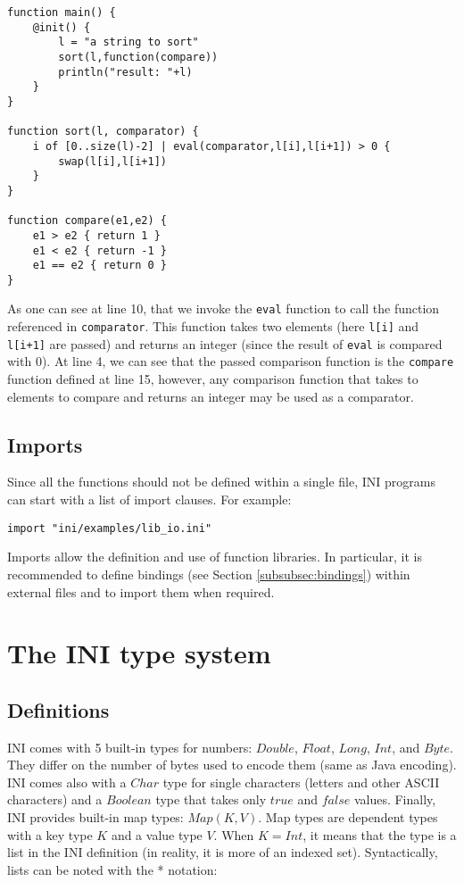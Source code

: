 \documentclass[11pt]{article}
\begin{document}
{ \small
\begin{lstlisting}
function main() {
	@init() {
		l = "a string to sort"
		sort(l,function(compare))
		println("result: "+l)
	}
}

function sort(l, comparator) {
	i of [0..size(l)-2] | eval(comparator,l[i],l[i+1]) > 0 {
		swap(l[i],l[i+1])
	}
}

function compare(e1,e2) {
	e1 > e2 { return 1 }
	e1 < e2 { return -1 }
	e1 == e2 { return 0 }
}
\end{lstlisting} }

As one can see at line 10, that we invoke the \texttt{eval} function to call the function referenced in \texttt{comparator}. This function takes two elements (here \texttt{l[i]} and \texttt{l[i+1]} are passed) and returns an integer (since the result of \texttt{eval} is compared with 0). At line 4, we can see that the passed comparison function is the \texttt{compare} function defined at line 15, however, any comparison function that takes to elements to compare and returns an integer may be used as a comparator.

\subsection{Imports}

Since all the functions should not be defined within a single file, INI programs can start with a list of import clauses. For example:

\begin{lstlisting}[numbers=none]
import "ini/examples/lib_io.ini"
\end{lstlisting}

Imports allow the definition and use of function libraries. In particular, it is recommended to define bindings (see Section \ref{subsubsec:bindings}) within external files and to import them when required.

\section{The INI type system}

\subsection{Definitions}

INI comes with 5 built-in types for numbers: $Double$, $Float$, $Long$, $Int$, and $Byte$. They differ on the number of bytes used to encode them (same as Java encoding). INI comes also with a $Char$ type for single characters (letters and other ASCII characters) and a $Boolean$ type that takes only $true$ and $false$ values.
Finally, INI provides built-in map types: $Map(K,V)$. Map types are dependent types with a key type $K$ and a value type $V$. When $K=Int$, it means that the type is a list in the INI definition (in reality, it is more of an indexed set). Syntactically, lists can be noted with the * notation:
\end{document}
